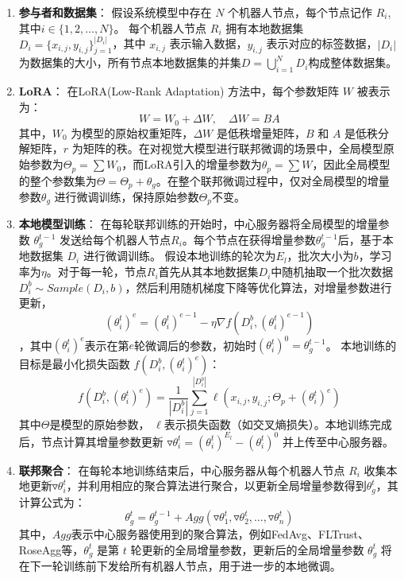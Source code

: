 \documentclass[lettersize,journal]{IEEEtran}
\begin{document}
\begin{enumerate}
    \item \textbf{参与者和数据集}：
    假设系统模型中存在 $N$ 个机器人节点，每个节点记作 $R_i$, 其中$i \in \{1, 2, \ldots, N\}$。 每个机器人节点 $R_i$ 拥有本地数据集 $D_i = \{x_{i,j}, y_{i,j}\}_{j=1}^{|D_i|}$，其中 $x_{i,j}$ 表示输入数据，$y_{i,j}$ 表示对应的标签数据，$|D_i|$ 为数据集的大小，所有节点本地数据集的并集$D = \bigcup_{i=1}^{N} D_i$构成整体数据集。

    \item \textbf{LoRA}：
    在LoRA(Low-Rank Adaptation) \cite{lora}方法中，每个参数矩阵 $W$ 被表示为：
    \[
    W = W_0 + \Delta W, \quad \Delta W = BA
    \]
    其中，$W_0$ 为模型的原始权重矩阵，$\Delta W$ 是低秩增量矩阵，$B$ 和 $A$ 是低秩分解矩阵，$r$ 为矩阵的秩。在对视觉大模型进行联邦微调的场景中，全局模型原始参数为$\Theta_p = \sum {W_0}$，而LoRA引入的增量参数为$\theta_p = \sum {W}$，因此全局模型的整个参数集为$\Theta = \Theta_p + \theta_g$。在整个联邦微调过程中，仅对全局模型的增量参数$\theta_g$ 进行微调训练，保持原始参数$\Theta_p$不变。
    
    \item \textbf{本地模型训练}：
    在每轮联邦训练的开始时，中心服务器将全局模型的增量参数 $\theta_g^{t-1}$ 发送给每个机器人节点$R_i$。每个节点在获得增量参数$\theta_g^{t-1}$后，基于本地数据集 $D_i$ 进行微调训练。
    假设本地训练的轮次为$E_l$，批次大小为$b$，学习率为$\eta$。对于每一轮，节点$R_i$首先从其本地数据集$D_i$中随机抽取一个批次数据$D_i^b \sim Sample(D_i, b)$，然后利用随机梯度下降等优化算法，对增量参数进行更新，
    \[
    (\theta_i^{t})^e = (\theta_i^{t})^{e-1} - \eta \nabla f(D_i^b, (\theta_i^{t})^{e-1})\]
    ，其中$(\theta_i^{t})^e$表示在第$e$轮微调后的参数，初始时$(\theta_i^{t})^0 = \theta_g^{t-1}$。
    本地训练的目标是最小化损失函数 $f(D_i^b, (\theta_i^{t})^e)$：
    \[
    f(D_i^b, (\theta_i^{t})^e) = \frac{1}{|D_i^b|} \sum_{j=1}^{|D_i^b|} \ell(x_{i,j}, y_{i,j}; \Theta_p + (\theta_i^{t})^e)
    \]
    其中$\Theta$是模型的原始参数， $\ell$表示损失函数（如交叉熵损失）。本地训练完成后，节点计算其增量参数更新 $\triangledown \theta_i^t = (\theta_i^t)^{E_l} - (\theta_i^t)^0$ 并上传至中心服务器。
    \item \textbf{联邦聚合}：
    在每轮本地训练结束后，中心服务器从每个机器人节点 $R_i$ 收集本地更新$\triangledown \theta_i^t$，并利用相应的聚合算法进行聚合，以更新全局增量参数得到$\theta_g^t$，其计算公式为：
    \[
    \theta_g^t = \theta_g^{t-1} + Agg(\triangledown \theta_1^t, \triangledown \theta_2^t, \dots, \triangledown \theta_n^t)
    \]
    其中，$Agg$表示中心服务器使用到的聚合算法，例如FedAvg、FLTrust\cite{cao2020fltrust}、RoseAgg\cite{yang2024roseagg}等，$\theta_g^t$ 是第 $t$ 轮更新的全局增量参数，更新后的全局增量参数 $\theta_g^t$ 将在下一轮训练前下发给所有机器人节点，用于进一步的本地微调。
\end{enumerate}
\end{document}

